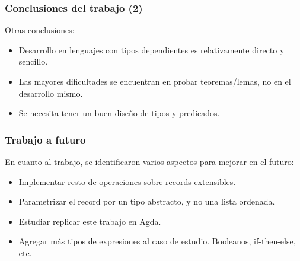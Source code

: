 \documentclass{beamer}
\begin{document}
\begin{frame}
\frametitle{Conclusiones del trabajo (2)}

Otras conclusiones:

\begin{itemize}
\item Desarrollo en lenguajes con tipos dependientes es relativamente directo y sencillo.
\item Las mayores dificultades se encuentran en probar teoremas/lemas, no en el desarrollo mismo.
\item Se necesita tener un buen diseño de tipos y predicados.
\end{itemize}

\end{frame}

\begin{frame}
\frametitle{Trabajo a futuro}

En cuanto al trabajo, se identificaron varios aspectos para mejorar en el futuro:

\begin{itemize}
\item Implementar resto de operaciones sobre records extensibles.
\item Parametrizar el record por un tipo abstracto, y no una lista ordenada.
\item Estudiar replicar este trabajo en Agda.
\item Agregar más tipos de expresiones al caso de estudio. Booleanos, if-then-else, etc.
\end{itemize}
\end{frame}
\end{document}
